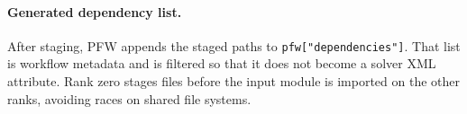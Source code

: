 \paragraph{Generated dependency list.}
After staging, PFW appends the staged paths to \texttt{pfw["dependencies"]}.  That list is workflow metadata and is filtered so that it does not become a solver XML attribute.  Rank zero stages files before the input module is imported on the other ranks, avoiding races on shared file systems.
